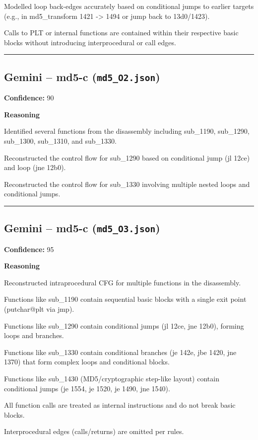 Modelled loop back-edges accurately based on conditional jumps to earlier targets (e.g., in md5\_transform 1421 -> 1494 or jump back to 13d0/1423).

Calls to PLT or internal functions are contained within their respective basic blocks without introducing interprocedural or call edges.

\bigskip
\hrule
\bigskip

\subsection{Gemini -- md5-c (\texttt{md5\_O2.json})}

\textbf{Confidence:} 90

\textbf{Reasoning}

Identified several functions from the disassembly including sub\_1190, sub\_1290, sub\_1300, sub\_1310, and sub\_1330.

Reconstructed the control flow for sub\_1290 based on conditional jump (jl 12ce) and loop (jne 12b0).

Reconstructed the control flow for sub\_1330 involving multiple nested loops and conditional jumps.

\bigskip
\hrule
\bigskip

\subsection{Gemini -- md5-c (\texttt{md5\_O3.json})}

\textbf{Confidence:} 95

\textbf{Reasoning}

Reconstructed intraprocedural CFG for multiple functions in the disassembly.

Functions like sub\_1190 contain sequential basic blocks with a single exit point (putchar@plt via jmp).

Functions like sub\_1290 contain conditional jumps (jl 12ce, jne 12b0), forming loops and branches.

Functions like sub\_1330 contain conditional branches (je 142e, jbe 1420, jne 1370) that form complex loops and conditional blocks.

Functions like sub\_1430 (MD5/cryptographic step-like layout) contain conditional jumps (je 1554, je 1520, je 1490, jne 1540).

All function calls are treated as internal instructions and do not break basic blocks.

Interprocedural edges (calls/returns) are omitted per rules.


